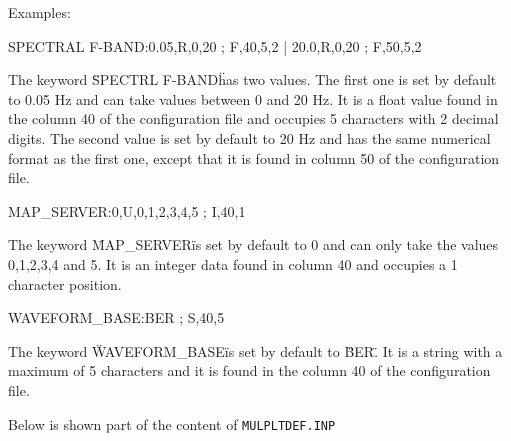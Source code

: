 Examples: 

SPECTRAL F-BAND:0.05,R,0,20 ; F,40,5,2 | 20.0,R,0,20 ; F,50,5,2 

The keyword \"SPECTRL F-BAND\" has two values. The first one is set by default to 0.05 Hz and can take values between 0 and 20 Hz. It is a float value found in the column 40 of the configuration file and occupies 5 characters with 2 decimal digits. The second value is set by default to 20 Hz and has the same numerical format as the first one, except that it is found in  column 50 of the configuration file. 

MAP\_SERVER:0,U,0,1,2,3,4,5 ; I,40,1 

The keyword \"MAP\_SERVER\" is set by default to 0 and can only take the values 0,1,2,3,4 and 5. It is 
an integer data found in column 40 and occupies a 1 character position. 

WAVEFORM\_BASE:BER ; S,40,5 

The keyword \"WAVEFORM\_BASE\" is set by default to \"BER\". It is a string with a maximum of 5 characters and it is found in the column 40 of the configuration file. 

Below is shown part of the content of \texttt{MULPLTDEF.INP} 





